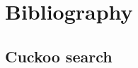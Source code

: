 \documentclass[a4paper, 5p, sort&compress]{elsarticle}%
\begin{document}


\FloatBarrier

\section*{Bibliography}



\clearpage
\appendix

\subsection{Cuckoo search}
\label{sec:cuckoo-search}


\end{document}
